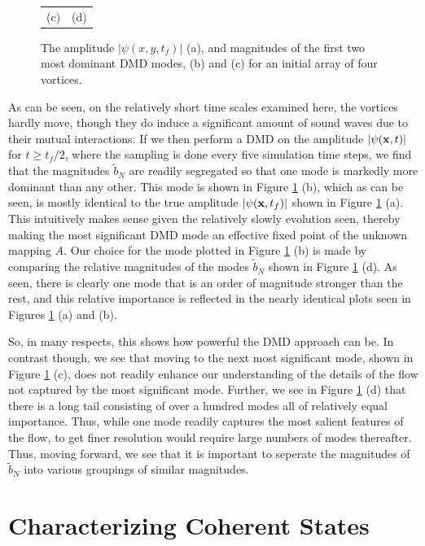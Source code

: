 \documentclass[a4paper,11pt]{article}
\begin{document}
\begin{figure}
\begin{tabular}{cc}
(c) & (d) 
\end{tabular}
\caption{The amplitude $\left|\psi(x,y,t_{f})\right|$ (a), and magnitudes of the first two most dominant DMD modes, (b) and (c) for an initial array of four vortices.  }
\label{fig:frvtx}
\end{figure}

As can be seen, on the relatively short time scales examined here, the vortices hardly move, though they do induce a significant amount of sound waves due to their mutual interactions.  If we then perform a DMD on the amplitude $\left|\psi({\bf x},t)\right|$ for $t\geq t_{f}/2$, where the sampling is done every five simulation time steps, we find that the magnitudes $\tilde{b}_{N}$ are readily segregated so that one mode is markedly more dominant than any other.  This mode is shown in Figure \ref{fig:frvtx} (b), which as can be seen, is mostly identical to the true amplitude $\left|\psi({\bf x},t_{f})\right|$ shown in Figure \ref{fig:frvtx} (a).  This intuitively makes sense given the relatively slowly evolution seen, thereby making the most significant DMD mode an effective fixed point of the unknown mapping $A$.  Our choice for the mode plotted in Figure \ref{fig:frvtx} (b) is made by comparing the relative magnitudes of the modes $\tilde{b}_{N}$ shown in Figure \ref{fig:frvtx} (d).  As seen, there is clearly one mode that is an order of magnitude stronger than the rest, and this relative importance is reflected in the nearly identical plots seen in Figures \ref{fig:frvtx} (a) and (b).

So, in many respects, this shows how powerful the DMD approach can be.  In contrast though, we see that moving to the next most significant mode, shown in Figure \ref{fig:frvtx} (c), does not readily enhance our understanding of the details of the flow not captured by the most significant mode.  Further, we see in Figure \ref{fig:frvtx} (d) that there is a long tail consisting of over a hundred modes all of relatively equal importance.  Thus, while one mode readily captures the most salient features of the flow, to get finer resolution would require large numbers of modes thereafter.  Thus, moving forward, we see that it is important to seperate the magnitudes of $\tilde{b}_{N}$ into various groupings of similar magnitudes.  
 
\section*{Characterizing Coherent States}
\end{document}
